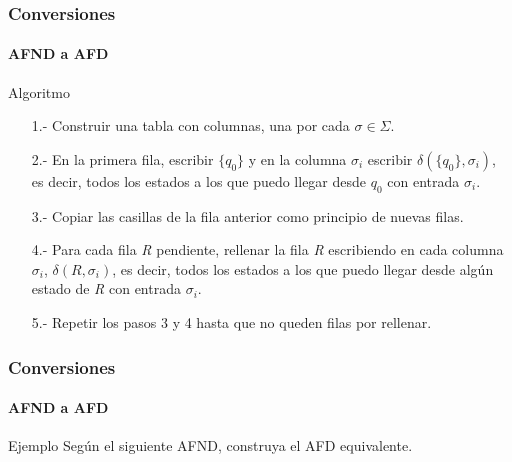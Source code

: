\documentclass{beamer}
\begin{document}
        \begin{frame}
			\frametitle{Conversiones}
			\framesubtitle{AFND a AFD}

            \begin{block}{Algoritmo}
               \begin{enumerate}
                   \item[1.-] Construir una tabla con columnas, una por cada $\sigma \in \Sigma$.
                   \item[2.-] En la primera fila, escribir $\{q_{0}\}$ y en la columna $\sigma_{i}$ escribir $\delta(\{q_{0}\},\sigma_{i})$, es decir, todos los estados a los que puedo llegar desde $q_{0}$ con entrada $\sigma_{i}$.
                   \item[3.-] Copiar las casillas de la fila anterior como principio de nuevas filas.
                   \item[4.-] Para cada fila \emph{R} pendiente, rellenar la fila \emph{R} escribiendo en cada columna $\sigma_{i}$, $\delta(R,\sigma_{i})$, es decir, todos los estados a los que puedo llegar desde alg\'un estado de \emph{R} con entrada $\sigma_{i}$.
                   \item[5.-] Repetir los pasos 3 y 4 hasta que no queden filas por rellenar.
               \end{enumerate}
            \end{block}
		\end{frame}

        \begin{frame}
			\frametitle{Conversiones}
			\framesubtitle{AFND a AFD}

            \begin{exampleblock}{Ejemplo}
               Seg\'un el siguiente AFND, construya el AFD equivalente.
               \begin{center}
			   \end{center}
            \end{exampleblock}
		\end{frame}
		
\end{document}
